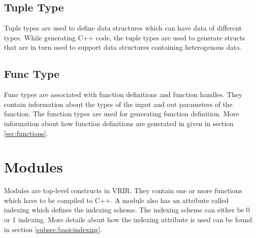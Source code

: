 \subsection{Tuple Type}
Tuple types are used to define data structures which can have data of different types. While generating C++ code, the tuple types are used to generate structs that are in turn used to support data structures containing heterogenous data.
\subsection{Func Type}
Func types are associated with function definitions and function handles. They contain information about the types of the input and out parameters of the function. The function types are used for generating function definition. More information about how function definitions are generated in given in section \ref{sec:functions}.
\section{Modules}
Modules are top-level constructs in VRIR. They contain one or more functions which have to be compiled to C++. A module also has an attribute called indexing which defines the indexing scheme. The indexing scheme can either be 0 or 1 indexing. More details about how the indexing attribute is used can be found in section \ref{subsec:basicindexing}.

